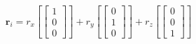 \documentclass[preview]{standalone}
\begin{document}
\begin{align*}
\textbf{r}_i= r_{\!x} \left[ \begin{bmatrix}1\\0\\0\end{bmatrix} \right] +r_{\!y} \left[ \begin{bmatrix}0\\1\\0\end{bmatrix} \right] +r_{\!z} \left[ \begin{bmatrix}0\\0\\1\end{bmatrix} \right]
\end{align*}
\end{document}
